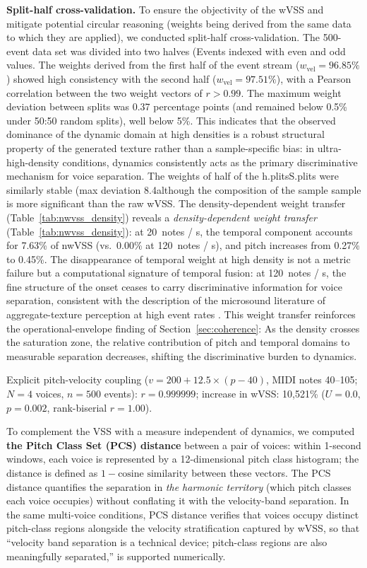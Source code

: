 \documentclass[a4paper]{article}
\theoremstyle{definition}
\theoremstyle{remark}
\begin{document}
\textbf{Split-half cross-validation.} To ensure the objectivity of the wVSS and mitigate potential circular reasoning (weights being derived from the same data to which they are applied), we conducted split-half cross-validation. The 500-event data set was divided into two halves (Events indexed with even and odd values. The weights derived from the first half of the event stream ($w_{\text{vel}} = 96.85\%$) showed high consistency with the second half ($w_{\text{vel}} = 97.51\%$), with a Pearson correlation between the two weight vectors of $r > 0.99$. The maximum weight deviation between splits was 0.37 percentage points (and remained below 0.5\% under 50:50 random splits), well below 5\%. This indicates that the observed dominance of the dynamic domain at high densities is a robust structural property of the generated texture rather than a sample-specific bias: in ultra-high-density conditions, dynamics consistently acts as the primary discriminative mechanism for voice separation. The weights of half of the h.plitsS.plits were similarly stable (max deviation 8.4although the composition of the sample sample is more significant than the raw wVSS.
 The density-dependent weight transfer (Table~\ref{tab:nwvss_density}) reveals a \emph{density-dependent weight transfer} (Table~\ref{tab:nwvss_density}): at 20~notes / s, the temporal component accounts for 7.63\% of nwVSS (vs.\ 0.00\% at 120~notes / s), and pitch increases from 0.27\% to 0.45\%. The disappearance of temporal weight at high density is not a metric failure but a computational signature of temporal fusion: at 120~notes / s, the fine structure of the onset ceases to carry discriminative information for voice separation, consistent with the description of the microsound literature of aggregate-texture perception at high event rates \citep{roads2004microsound, mcdermott2013summary}. This weight transfer reinforces the operational-envelope finding of Section~\ref{sec:coherence}: As the density crosses the saturation zone, the relative contribution of pitch and temporal domains to measurable separation decreases, shifting the discriminative burden to dynamics.


Explicit pitch-velocity coupling ($v = 200 + 12.5 \times (p - 40)$, MIDI notes 40--105; $N = 4$ voices, $n = 500$ events): $r = 0.999999$; increase in wVSS: 10{,}521\% ($U = 0.0$, $p = 0.002$, rank-biserial $r = 1.00$).

To complement the VSS with a measure independent of dynamics, we computed \textbf{the Pitch Class Set (PCS) distance} between a pair of voices: within 1-second windows, each voice is represented by a 12-dimensional pitch class histogram; the distance is defined as $1 - \text{cosine similarity}$ between these vectors. The PCS distance quantifies the separation in \emph{the harmonic territory} (which pitch classes each voice occupies) without conflating it with the velocity-band separation. In the same multi-voice conditions, PCS distance verifies that voices occupy distinct pitch-class regions alongside the velocity stratification captured by wVSS, so that ``velocity band separation is a technical device; pitch-class regions are also meaningfully separated,'' is supported numerically. 
\end{document}
